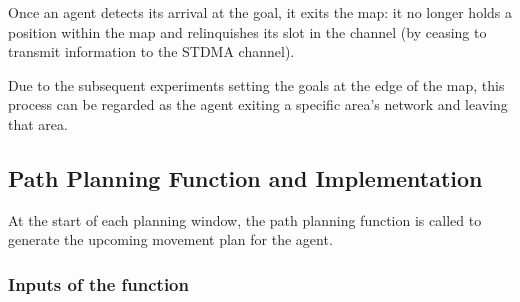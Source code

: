 Once an agent detects its arrival at the goal, it exits the map: it no longer holds a position within the map and relinquishes its slot in the channel (by ceasing to transmit information to the STDMA channel).

Due to the subsequent experiments setting the goals at the edge of the map, this process can be regarded as the agent exiting a specific area's network and leaving that area.


\subsection{Path Planning Function and Implementation}

At the start of each planning window, the path planning function is called to generate the upcoming movement plan for the agent.

\subsubsection{Inputs of the function}

